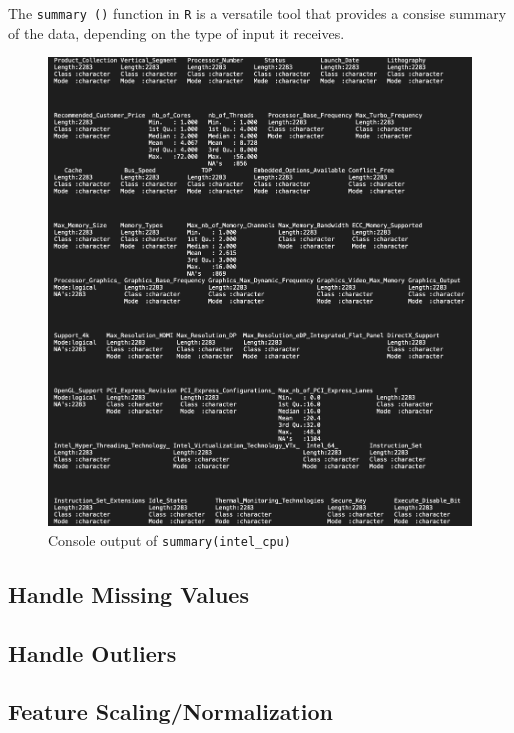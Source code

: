 The \texttt{summary ()} function in \texttt{R} is a versatile tool that provides a consise summary of the data, depending on the type of input it receives.

\begin{figure}[H]
    \centering
    \includegraphics[width=14cm]{graphics/summary.png}
    \caption*{Console output of \texttt{summary(intel\_cpu)}}
\end{figure}

\subsection{Handle Missing Values}

\subsection{Handle Outliers}

\subsection{Feature Scaling/Normalization}

\newpage